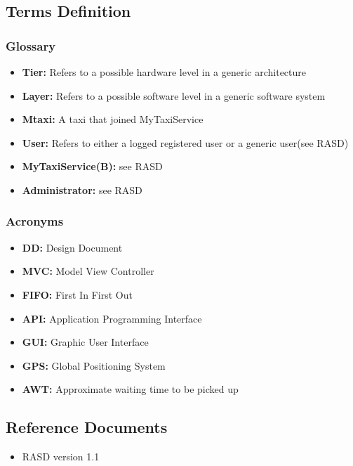 \documentclass[11pt,titlepage]{article} %
\begin{document}
\subsection{Terms Definition}
	\subsubsection{Glossary}
		\begin{itemize}
			\item \textbf{Tier:} Refers to a possible hardware level in a generic architecture
	        		\item \textbf{Layer:} Refers to a possible software level in a generic software system
			\item \textbf{Mtaxi:} A taxi that joined MyTaxiService
			\item \textbf{User:} Refers to either a logged registered user or a generic user(see RASD)
			\item \textbf{MyTaxiService(B):} see RASD
			\item \textbf{Administrator:} see RASD
		\end{itemize}
	\subsubsection{Acronyms}
		\begin{itemize}
		        \item \textbf{DD:} Design Document
		        \item \textbf{MVC:} Model View Controller
		        \item \textbf{FIFO:} First In First Out
		        \item \textbf{API:} Application Programming Interface
		        \item \textbf{GUI:} Graphic User Interface
		        \item \textbf{GPS:} Global Positioning System
		        \item \textbf{AWT:} Approximate waiting time to be picked up
		\end{itemize}
		

\subsection{Reference Documents}
	\begin{itemize}
		\item RASD version 1.1
	\end{itemize}
\end{document}
